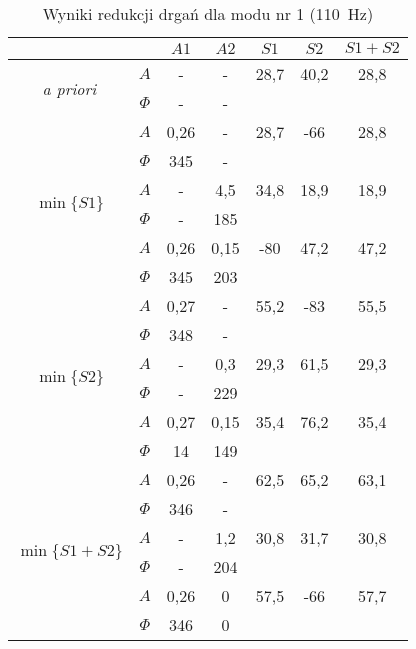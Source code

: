 \documentclass[polish,a4paper,11pt]{mwart}
\begin{document}
  \begin{table}[!tbh]
    \centering
    \caption{Wyniki redukcji drgań dla modu nr 1 (\SI{110}{\hertz})}
    \label{tab:red1}
    \begin{tabular}{|c|c|c|c|c|c|c|}
      \cline{3-7}
      \multicolumn{2}{c|}{}&$A1$&$A2$&$S1$&$S2$&$S1+S2$\\\hline
      \multirow{2}{*}{\textit{a priori}} & $A$ & - & - & 28,7 & 40,2 & 28,8\\\cline{2-7}
					 & $\Phi$ & - & - & \multicolumn{3}{c}{}\\\hline
      \multirow{6}{*}{$\min\{S1\}$}   &   $A$ & 0,26 & - & 28,7 & -66 & 28,8\\\cline{2-7}
				      &$\Phi$ & 345 & - & \multicolumn{3}{c}{}\\\cline{2-7}
				      &   $A$ & - & 4,5 & 34,8 & 18,9 & 18,9\\\cline{2-7}
				      &$\Phi$ & - & 185 & \multicolumn{3}{c}{}\\\cline{2-7}
				      &   $A$ & 0,26 & 0,15 & -80 & 47,2 & 47,2\\\cline{2-7}
				      &$\Phi$ & 345 & 203 & \multicolumn{3}{c}{}\\\hline
      \multirow{6}{*}{$\min\{S2\}$}   &   $A$ & 0,27 & - & 55,2 & -83 & 55,5\\\cline{2-7}
				      &$\Phi$ & 348 & - & \multicolumn{3}{c}{}\\\cline{2-7}
				      &   $A$ & - & 0,3 & 29,3 & 61,5 & 29,3\\\cline{2-7}
				      &$\Phi$ & - & 229 & \multicolumn{3}{c}{}\\\cline{2-7}
				      &   $A$ & 0,27 & 0,15 & 35,4 & 76,2 & 35,4\\\cline{2-7}
				      &$\Phi$ & 14 & 149 & \multicolumn{3}{c}{}\\\hline
      \multirow{6}{*}{$\min\{S1+S2\}$}&   $A$ & 0,26 & - & 62,5 & 65,2 & 63,1\\\cline{2-7}
				      &$\Phi$ & 346 & - & \multicolumn{3}{c}{}\\\cline{2-7}
				      &   $A$ & - & 1,2 & 30,8 & 31,7 & 30,8\\\cline{2-7}
				      &$\Phi$ & - & 204 & \multicolumn{3}{c}{}\\\cline{2-7}
				      &   $A$ & 0,26 & 0 & 57,5 & -66 & 57,7\\\cline{2-7}
				      &$\Phi$ & 346 & 0 & \multicolumn{3}{c}{}\\\cline{1-4}
    \end{tabular}
  \end{table}
\end{document}

